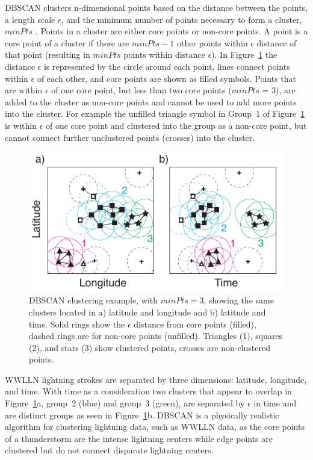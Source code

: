 DBSCAN clusters n-dimensional points based on the distance between the points, a length scale $\epsilon$, and the minimum number of points necessary to form a cluster, $minPts$ \citep{Kriegel2011a}.
Points in a cluster are either core points or non-core points.
A point is a core point of a cluster if there are $minPts - 1$ other points within $\epsilon$ distance of that point (resulting in $minPts$ points within distance $\epsilon$).
In Figure~\ref{gec:fig:dbscan} the distance $\epsilon$ is represented by the circle around each point, lines connect points within $\epsilon$ of each other, and core points are shown as filled symbols.
Points that are within $\epsilon$ of one core point, but less than two core points ($minPts$ = 3), are added to the cluster as non-core points and cannot be used to add more points into the cluster.
For example the unfilled triangle symbol in Group~1 of Figure~\ref{gec:fig:dbscan} is within $\epsilon$ of one core point and clustered into the group as a non-core point, but cannot connect further unclustered points (crosses) into the cluster.

 \begin{figure}[ht!]
    \centering
    \includegraphics[scale=1]{GEC/Figures/dbscan.pdf}
    \caption{DBSCAN clustering example, with $minPts = 3$, showing the same clusters located in a) latitude and longitude and b) latitude and time.
    		 Solid rings show the $\epsilon$ distance from core points (filled), dashed rings are for non-core points (unfilled).
		 Triangles (1), squares (2), and stars (3) show clustered points, crosses are non-clustered points.}
    \label{gec:fig:dbscan}
 \end{figure}

WWLLN lightning strokes are separated by three dimensions: latitude, longitude, and time.
With time as a consideration two clusters that appear to overlap in Figure~\ref{gec:fig:dbscan}a, group~2 (blue) and group~3 (green), are separated by $\epsilon$ in time and are distinct groups as seen in Figure~\ref{gec:fig:dbscan}b.
DBSCAN is a physically realistic algorithm for clustering lightning data, such as WWLLN data, as the core points of a thunderstorm are the intense lightning centers while edge points are clustered but do not connect disparate lightning centers.

